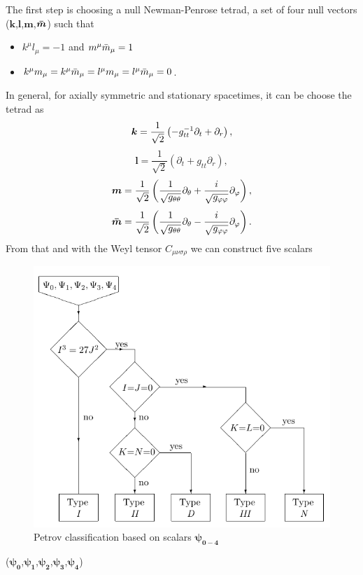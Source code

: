 The first step is choosing a null Newman-Penrose tetrad, a set of four null vectors ($\boldsymbol{k}$,$\boldsymbol{l}$,$\boldsymbol{m}$,$\boldsymbol{\Bar{m}}$) such that
\begin{itemize}
    \item $k^{\mu}l_{\mu}=-1$ and $m^{\mu}\Bar{m}_{\mu}=1$
    \item $k^{\mu}m_{\mu}=k^{\mu}\Bar{m}_{\mu}=l^{\mu}m_{\mu}=l^{\mu}\Bar{m}_{\mu}=0$.
\end{itemize}
In general, for axially symmetric and stationary spacetimes, it can be choose the tetrad as 
\begin{equation}
    \boldsymbol{k} = \frac{1}{\sqrt{2}}\left(-g_{tt}^{-1}\partial_t+\partial_r\right), \notag
\end{equation}
\begin{equation}
    \boldsymbol{l} = \frac{1}{\sqrt{2}}\left(\partial_t+g_{tt}\partial_r\right),
    \label{tetrad assiale generale}
\end{equation}
\begin{equation}
    \boldsymbol{m} = \frac{1}{\sqrt{2}}\left(\frac{1}{\sqrt{g_{\theta\theta}}}\partial_{\theta}+\frac{i}{\sqrt{g_{\varphi\varphi}}}\partial_{\varphi}\right), \notag
\end{equation}
\begin{equation}
    \boldsymbol{\Bar{m}} = \frac{1}{\sqrt{2}}\left(\frac{1}{\sqrt{g_{\theta\theta}}}\partial_{\theta}-\frac{i}{\sqrt{g_{\varphi\varphi}}}\partial_{\varphi}\right). \notag
\end{equation}
From that and with the Weyl tensor $C_{\mu \nu \sigma \rho}$ we can construct five scalars 
\begin{figure}
    \centering
    \includegraphics[width=0.7\linewidth]{Figures/Ch5/petrov scheme.png}
    \caption{Petrov classification based on scalars $\boldsymbol{\psi_{0-4}}$}
    \label{petrov classification}
\end{figure}($\boldsymbol{\psi_0}$,$\boldsymbol{\psi_1}$,$\boldsymbol{\psi_2}$,$\boldsymbol{\psi_3}$,$\boldsymbol{\psi_4}$) 
